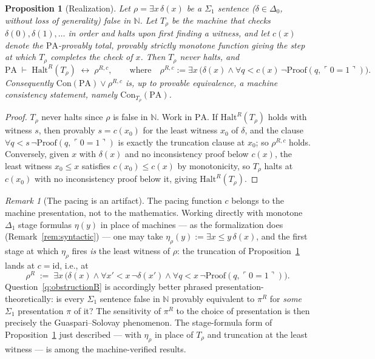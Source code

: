 \documentclass[11pt]{amsart}
\newtheorem{proposition}[theorem]{Proposition}
\theoremstyle{definition}
\theoremstyle{remark}
\newtheorem{remark}[theorem]{Remark}
\newcommand{\PA}{\mathrm{PA}}
\newcommand{\Con}{\mathrm{Con}}
\newcommand{\Pf}{\mathrm{Proof}}
\newcommand{\godel}[1]{\ulcorner #1 \urcorner}
\newcommand{\N}{\mathbb{N}}
\begin{document}
\begin{proposition}[Realization]\label{prop:realization}
Let $\rho=\exists x\,\delta(x)$ be a $\Sigma_1$ sentence
($\delta\in\Delta_0$, without loss of generality) false in $\N$. Let
$T_\rho$ be the machine that checks $\delta(0),\delta(1),\dots$ in order
and halts upon first finding a witness, and let $c(x)$ denote the
$\PA$-provably total, provably strictly monotone function giving the step
at which $T_\rho$ completes the check of $x$. Then $T_\rho$ never halts,
and
\[
\PA\;\vdash\;\mathrm{Halt}^R(T_\rho)\;\longleftrightarrow\;\rho^{R,c},
\qquad\text{where}\quad
\rho^{R,c}:=\exists x\,\bigl(\delta(x)\wedge
   \forall q<c(x)\,\neg\Pf(q,\godel{0{=}1})\bigr).
\]
Consequently $\Con(\PA)\vee\rho^{R,c}$ is, up to provable equivalence, a
machine consistency statement, namely $\Con_{T_\rho}(\PA)$.
\end{proposition}

\begin{proof}
$T_\rho$ never halts since $\rho$ is false in $\N$. Work in $\PA$. If
$\mathrm{Halt}^R(T_\rho)$ holds with witness $s$, then provably $s=c(x_0)$
for the least witness $x_0$ of $\delta$, and the clause
$\forall q<s\,\neg\Pf(q,\godel{0{=}1})$ is exactly the truncation clause
at $x_0$; so $\rho^{R,c}$ holds. Conversely, given $x$ with $\delta(x)$
and no inconsistency proof below $c(x)$, the least witness $x_0\le x$
satisfies $c(x_0)\le c(x)$ by monotonicity, so $T_\rho$ halts at
$c(x_0)$ with no inconsistency proof below it, giving
$\mathrm{Halt}^R(T_\rho)$.
\end{proof}

\begin{remark}[The pacing is an artifact]\label{rem:pacing}
The pacing function $c$ belongs to the machine presentation, not to the
mathematics. Working directly with monotone $\Delta_1$ stage formulas
$\eta(y)$ in place of machines --- as the formalization does
(Remark~\ref{rem:syntactic}) --- one may take
$\eta_\rho(y):=\exists x\le y\,\delta(x)$, and the first stage at which
$\eta_\rho$ fires \emph{is} the least witness of $\rho$: the truncation
of Proposition~\ref{prop:realization} lands at $c=\mathrm{id}$, i.e.,
at
\[
\rho^{R}\;:=\;\exists x\,\bigl(\delta(x)\wedge\forall x'<x\,\neg\delta(x')
\wedge\forall q<x\,\neg\Pf(q,\godel{0{=}1})\bigr).
\]
Question~\ref{q:obstructionB} is accordingly better phrased
presentation-theoretically: is every $\Sigma_1$ sentence false in $\N$
provably equivalent to $\pi^{R}$ for \emph{some} $\Sigma_1$ presentation
$\pi$ of it? The sensitivity of $\pi^R$ to the choice of presentation is
then precisely the Guaspari--Solovay phenomenon. The stage-formula form
of Proposition~\ref{prop:realization} just described --- with
$\eta_\rho$ in place of $T_\rho$ and truncation at the least witness ---
is among the machine-verified results.
\end{remark}
\end{document}
